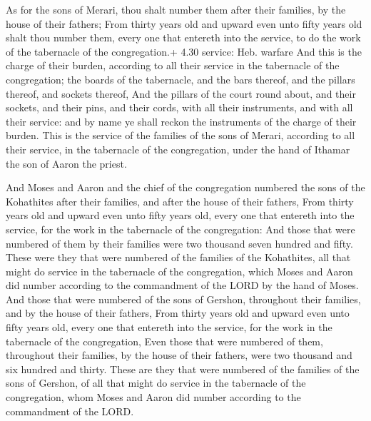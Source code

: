  As for the sons of Merari, thou shalt number them after
their families, by the house of their fathers;  From thirty
years old and upward even unto fifty years old shalt thou number them,
every one that entereth into the service, to do the work of the
tabernacle of the congregation.+ 4.30 service: Heb. warfare
 And this is the charge of their burden, according to all
their service in the tabernacle of the congregation; the boards of the
tabernacle, and the bars thereof, and the pillars thereof, and sockets
thereof,  And the pillars of the court round about, and
their sockets, and their pins, and their cords, with all their
instruments, and with all their service: and by name ye shall reckon the
instruments of the charge of their burden.  This is the
service of the families of the sons of Merari, according to all their
service, in the tabernacle of the congregation, under the hand of
Ithamar the son of Aaron the priest.

 And Moses and Aaron and the chief of the congregation
numbered the sons of the Kohathites after their families, and after the
house of their fathers,  From thirty years old and upward
even unto fifty years old, every one that entereth into the service, for
the work in the tabernacle of the congregation:  And those
that were numbered of them by their families were two thousand seven
hundred and fifty.  These were they that were numbered of
the families of the Kohathites, all that might do service in the
tabernacle of the congregation, which Moses and Aaron did number
according to the commandment of the LORD by the hand of Moses.
 And those that were numbered of the sons of Gershon,
throughout their families, and by the house of their fathers,
 From thirty years old and upward even unto fifty years
old, every one that entereth into the service, for the work in the
tabernacle of the congregation,  Even those that were
numbered of them, throughout their families, by the house of their
fathers, were two thousand and six hundred and thirty. 
These are they that were numbered of the families of the sons of
Gershon, of all that might do service in the tabernacle of the
congregation, whom Moses and Aaron did number according to the
commandment of the LORD.

